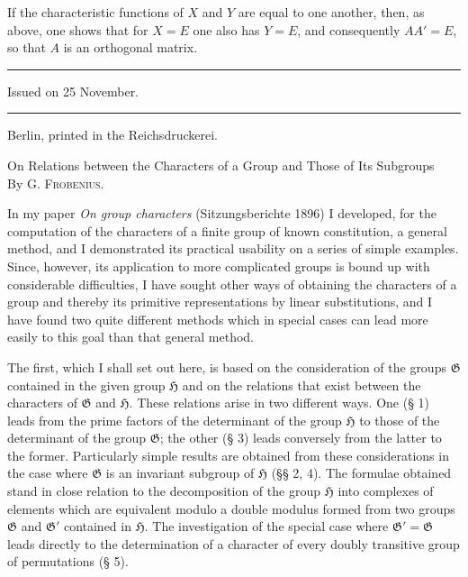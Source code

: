 \documentclass[11pt]{article}
\newcommand{\Hgr}{\mathfrak{H}}
\newcommand{\Ggr}{\mathfrak{G}}
\begin{document}
If the characteristic functions of $X$ and $Y$ are equal to one another, then, as above, one shows that for $X=E$ one also has $Y=E$, and consequently $AA'=E$, so that $A$ is an orthogonal matrix.

\begin{center}
\rule{40mm}{0.4pt}

Issued on 25 November.

\rule{40mm}{0.4pt}
\end{center}

\begin{flushright}
Berlin, printed in the Reichsdruckerei.
\end{flushright}

\clearpage

\begin{center}
{\Large On Relations between the Characters of a Group and Those of Its Subgroups}\\[0.75em]
By G. \textsc{Frobenius}.
\end{center}

In my paper \emph{On group characters} (Sitzungsberichte 1896) I developed, for the computation of the characters of a finite group of known constitution, a general method, and I demonstrated its practical usability on a series of simple examples. Since, however, its application to more complicated groups is bound up with considerable difficulties, I have sought other ways of obtaining the characters of a group and thereby its primitive representations by linear substitutions, and I have found two quite different methods which in special cases can lead more easily to this goal than that general method.

The first, which I shall set out here, is based on the consideration of the groups $\Ggr$ contained in the given group $\Hgr$ and on the relations that exist between the characters of $\Ggr$ and $\Hgr$. These relations arise in two different ways. One (§ 1) leads from the prime factors of the determinant of the group $\Hgr$ to those of the determinant of the group $\Ggr$; the other (§ 3) leads conversely from the latter to the former. Particularly simple results are obtained from these considerations in the case where $\Ggr$ is an invariant subgroup of $\Hgr$ (§§ 2, 4). The formulae obtained stand in close relation to the decomposition of the group $\Hgr$ into complexes of elements which are equivalent modulo a double modulus formed from two groups $\Ggr$ and $\Ggr'$ contained in $\Hgr$. The investigation of the special case where $\Ggr'=\Ggr$ leads directly to the determination of a character of every doubly transitive group of permutations (§ 5).
\end{document}
